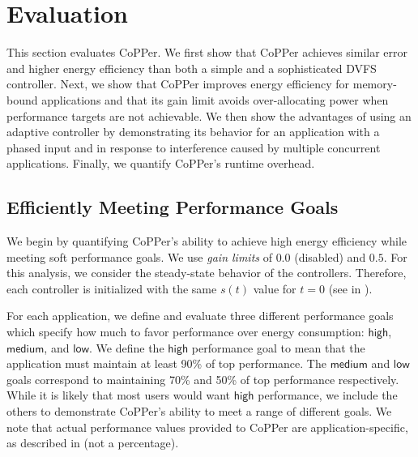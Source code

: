 \section{Evaluation}
\label{sec:copper-evaluation}

This section evaluates CoPPer.
We first show that CoPPer achieves similar error and higher energy efficiency than both a simple and a sophisticated DVFS controller.
Next, we show that CoPPer improves energy efficiency for memory-bound applications and that its gain limit avoids over-allocating power when performance targets are not achievable.
We then show the advantages of using an adaptive controller by demonstrating its behavior for an application with a phased input and in response to interference caused by multiple concurrent applications.
Finally, we quantify CoPPer's runtime overhead.


\subsection{Efficiently Meeting Performance Goals}
\label{sec:copper-eval-perf}

We begin by quantifying CoPPer's ability to achieve high energy efficiency while meeting soft performance goals.
We use \emph{gain limits} of $0.0$ (disabled) and $0.5$.
For this analysis, we consider the steady-state behavior of the controllers.
Therefore, each controller is initialized with the same $s(t)$ value for $t=0$ (see  in ).

For each application, we define and evaluate three different performance goals which specify how much to favor performance over energy consumption: $\mathsf{high}$, $\mathsf{medium}$, and $\mathsf{low}$.
We define the $\mathsf{high}$ performance goal to mean that the application must maintain at least 90\% of top performance.
The $\mathsf{medium}$ and $\mathsf{low}$ goals correspond to maintaining 70\% and 50\% of top performance respectively.
While it is likely that most users would want $\mathsf{high}$ performance, we include the others to demonstrate CoPPer's ability to meet a range of different goals.
We note that actual performance values provided to CoPPer are application-specific, as described in  (\ie not a percentage).

